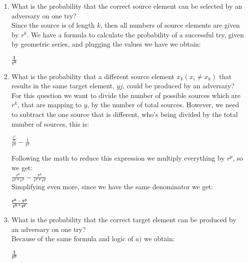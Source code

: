 \documentclass[12pt]{article}
\begin{document}
\begin{enumerate}
	\begin{enumerate}
		\item What is the probability that the correct source element can be selected by an adversary on one try?\\
		Since the source is of length $k$, then all numbers of source elements are given by $r^k$. We have a formula to calculate the probability of a successful try, given by geometric series, and plugging the values we have we obtain:  \begin{center} $\mathbf{\frac{1}{r^k}}$  \end{center}
		\vspace{40pt}
		\item What is the probability that a different source element $x_k(x_i  \neq x_k)$ that results in the same target element, $yj$, could be produced by an adversary?\\  For this question we want to divide the number of possible sources which are $r^k$, that are mapping to $y$, by the number of total sources. However, we need to subtract the one source that is different, who's being divided by the total number of sources, this is: 
		\begin{center} $\frac{\frac{r^k}{r^p}}{r^k} - \frac{1}{r^k}$ \end{center} 
		Following the math to reduce this expression we multiply everything by $r^p$, so we get: \\ $\frac{r^k}{r^p*r^k} - \frac{r^p}{r^k*r^p}$\\Simplifying even more, since we have the same denominator we get:\\ \begin{center} $\frac{\mathbf{r^k-r^p}}{\mathbf{r^k*r^p}}$ \end{center}
		\item What is the probability that the correct target element can be produced by an adversary on one try?\\ Because of the same formula and logic of $a)$ we obtain: \begin{center} $\mathbf{\frac{1}{r^p}}$ \end{center}
		
	\end{enumerate}
	
	\vspace{90pt}



\end{enumerate}
\end{document}
